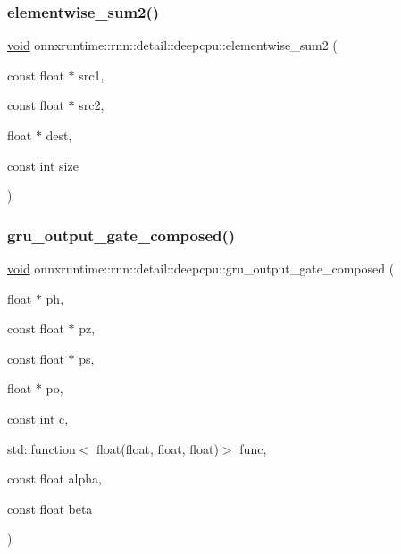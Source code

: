 \mbox{\label{namespaceonnxruntime_1_1rnn_1_1detail_1_1deepcpu_a4136092f6bcb01967ae4b82f668a9fd6}} 
\subsubsection{\texorpdfstring{elementwise\+\_\+sum2()}{elementwise\_sum2()}}
{\footnotesize\ttfamily \mbox{\hyperlink{mlasi_8h_a88f941d423cb2a819b70a1358982b1a6}{void}} onnxruntime\+::rnn\+::detail\+::deepcpu\+::elementwise\+\_\+sum2 (\begin{DoxyParamCaption}\item[{const float $\ast$}]{src1,  }\item[{const float $\ast$}]{src2,  }\item[{float $\ast$}]{dest,  }\item[{const int}]{size }\end{DoxyParamCaption})\hspace{0.3cm}{\ttfamily [inline]}}

\mbox{\label{namespaceonnxruntime_1_1rnn_1_1detail_1_1deepcpu_a2ad004b217fbf44c0b3c813b6aefd876}} 
\subsubsection{\texorpdfstring{gru\+\_\+output\+\_\+gate\+\_\+composed()}{gru\_output\_gate\_composed()}}
{\footnotesize\ttfamily \mbox{\hyperlink{mlasi_8h_a88f941d423cb2a819b70a1358982b1a6}{void}} onnxruntime\+::rnn\+::detail\+::deepcpu\+::gru\+\_\+output\+\_\+gate\+\_\+composed (\begin{DoxyParamCaption}\item[{float $\ast$}]{ph,  }\item[{const float $\ast$}]{pz,  }\item[{const float $\ast$}]{ps,  }\item[{float $\ast$}]{po,  }\item[{const int}]{c,  }\item[{std\+::function$<$ float(float, float, float)$>$}]{func,  }\item[{const float}]{alpha,  }\item[{const float}]{beta }\end{DoxyParamCaption})}

